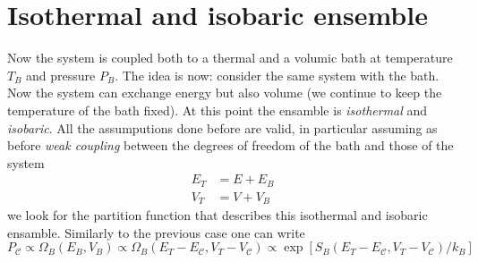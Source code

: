 \documentclass[../main/main.tex]{subfiles}
\begin{document}
\section{Isothermal and isobaric ensemble}
Now the system is coupled both to a thermal and a volumic bath at temperature \( T_B \) and pressure \( P_B \).
The idea is now: consider the same system with the bath. Now the system can exchange energy but also volume (we continue to keep the temperature of the bath fixed). At this point the ensamble is \emph{isothermal} and \emph{isobaric}. All the assumputions done before are valid, in particular assuming as before \emph{weak coupling} between the degrees of freedom of the bath and those of the system
\begin{subequations}
\begin{align}
  E_T &= E + E_B \\
  V_T &= V + V_B
\end{align}
\end{subequations}
we look for the partition function that describes this isothermal and isobaric ensamble.
Similarly to the previous case one can write
\begin{equation}
  P_{\mathcal{C}} \propto  \Omega _B (E_B,V_B) \propto \Omega _B (E_T-E_{\mathcal{C}}, V_T - V_{\mathcal{C}}) \propto \exp [S_B (E_T - E_{\mathcal{C}},V_T - V_{\mathcal{C}})/k_B]
\end{equation}
\end{document}
